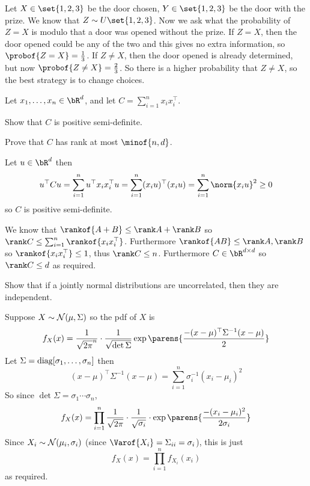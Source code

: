 \eexerc

Let $X\in\set{1,2,3}$ be the door chosen, $Y\in\set{1,2,3}$ be the door with the prize.
We know that $Z\sim U\set{1,2,3}$.
Now we ask what the probability of $Z=X$ is modulo that a door was opened without the prize.
If $Z=X$, then the door opened could be any of the two and this gives no extra information, so $\probof{Z=X}=\frac13$.
If $Z\neq X$, then the door opened is already determined, but now $\probof{Z\neq X}=\frac23$.
So there is a higher probability that $Z\neq X$, so the best strategy is to change choices.

\bexerc

    Let $x_1,\dots,x_n\in\bR^d$, and let $C=\sum_{i=1}^nx_ix_i^\top$.
    \benum
        \item Show that $C$ is positive semi-definite.
        \item Prove that $C$ has rank at most $\minof{n,d}$.
    \eenum

\eexerc

\benum
    \item Let $u\in\bR^d$ then
    $$ u^\top Cu = \sum_{i=1}^n u^\top x_ix_i^\top u = \sum_{i=1}^n (x_iu)^\top (x_iu) = \sum_{i=1}^n\norm{x_iu}^2 \geq 0 $$
    so $C$ is positive semi-definite.
    \item We know that $\rankof{A+B}\leq\rank A+\rank B$ so $\rank C\leq\sum_{i=1}^n\rankof{x_ix_i^\top}$.
    Furthermore $\rankof{AB}\leq\rank A,\rank B$ so $\rankof{x_ix_i^\top}\leq1$, thus $\rank C\leq n$.
    Furthermore $C\in\bR^{d\times d}$ so $\rank C\leq d$ as required.
\eenum

\bexerc

    Show that if a jointly normal distributions are uncorrelated, then they are independent.

\eexerc

Suppose $X\sim{\cal N}(\mu,\Sigma)$ so the pdf of $X$ is
$$ f_X(x) = \frac1{\sqrt{2\pi}^n}\cdot\frac1{\sqrt{\det\Sigma}}\exp\parens{\frac{-(x-\mu)^\top\Sigma^{-1}(x-\mu)}{2}} $$
Let $\Sigma={\rm diag}[\sigma_1,\dots,\sigma_n]$ then
$$ (x-\mu)^\top\Sigma^{-1}(x-\mu) = \sum_{i=1}^n\sigma_i^{-1}(x_i-\mu_i)^2 $$
So since $\det\Sigma=\sigma_1\cdots\sigma_n$,
$$ f_X(x) = \prod_{i=1}^n\frac1{\sqrt{2\pi}}\cdot\frac1{\sqrt{\sigma_i}}\cdot\exp\parens{\frac{-(x_i-\mu_i)^2}{2\sigma_i}} $$
Since $X_i\sim{\cal N}(\mu_i,\sigma_i)$ (since $\Varof{X_i}=\Sigma_{ii}=\sigma_i$), this is just
$$ f_X(x) = \prod_{i=1}^n f_{X_i}(x_i) $$
as required.

\bexerc

